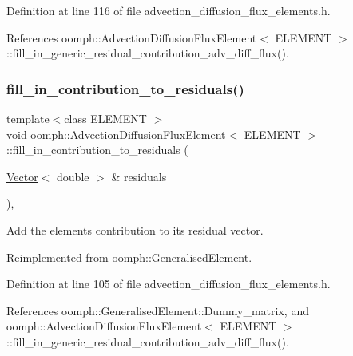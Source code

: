 Definition at line 116 of file advection\+\_\+diffusion\+\_\+flux\+\_\+elements.\+h.



References oomph\+::\+Advection\+Diffusion\+Flux\+Element$<$ E\+L\+E\+M\+E\+N\+T $>$\+::fill\+\_\+in\+\_\+generic\+\_\+residual\+\_\+contribution\+\_\+adv\+\_\+diff\+\_\+flux().

\mbox{\label{classoomph_1_1AdvectionDiffusionFluxElement_a7448e4359840f5090f879bc82b2319f8}} 
\subsubsection{\texorpdfstring{fill\+\_\+in\+\_\+contribution\+\_\+to\+\_\+residuals()}{fill\_in\_contribution\_to\_residuals()}}
{\footnotesize\ttfamily template$<$class E\+L\+E\+M\+E\+NT $>$ \\
void \hyperlink{classoomph_1_1AdvectionDiffusionFluxElement}{oomph\+::\+Advection\+Diffusion\+Flux\+Element}$<$ E\+L\+E\+M\+E\+NT $>$\+::fill\+\_\+in\+\_\+contribution\+\_\+to\+\_\+residuals (\begin{DoxyParamCaption}\item[{\hyperlink{classoomph_1_1Vector}{Vector}$<$ double $>$ \&}]{residuals }\end{DoxyParamCaption})\hspace{0.3cm}{\ttfamily [inline]}, {\ttfamily [virtual]}}



Add the element\textquotesingle{}s contribution to its residual vector. 



Reimplemented from \hyperlink{classoomph_1_1GeneralisedElement_a310c97f515e8504a48179c0e72c550d7}{oomph\+::\+Generalised\+Element}.



Definition at line 105 of file advection\+\_\+diffusion\+\_\+flux\+\_\+elements.\+h.



References oomph\+::\+Generalised\+Element\+::\+Dummy\+\_\+matrix, and oomph\+::\+Advection\+Diffusion\+Flux\+Element$<$ E\+L\+E\+M\+E\+N\+T $>$\+::fill\+\_\+in\+\_\+generic\+\_\+residual\+\_\+contribution\+\_\+adv\+\_\+diff\+\_\+flux().

